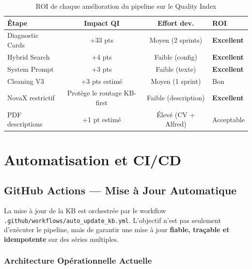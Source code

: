 \documentclass[12pt,a4paper]{report}
\begin{document}
\begin{table}[H]
\centering
\begin{tabular}{lccl}
\toprule
\textbf{Étape} & \textbf{Impact QI} & \textbf{Effort dev.} & \textbf{ROI} \\
\midrule
Diagnostic Cards & +33 pts & Moyen (2 sprints) & \textcolor{green!60!black}{\textbf{Excellent}} \\
Hybrid Search & +4 pts & Faible (config) & \textcolor{green!60!black}{\textbf{Excellent}} \\
System Prompt & +3 pts & Faible (texte) & \textcolor{green!60!black}{\textbf{Excellent}} \\
Cleaning V3 & +3 pts estimé & Moyen (1 sprint) & Bon \\
NovaX restrictif & Protège le routage KB-first & Faible (description) & \textcolor{green!60!black}{\textbf{Excellent}} \\
PDF descriptions & +1 pt estimé & Élevé (CV + Alfred) & Acceptable \\
\bottomrule
\end{tabular}
\caption{ROI de chaque amélioration du pipeline sur le Quality Index}
\label{tab:roi_pipeline_dead}
\end{table}

\fi

\chapter{Automatisation et CI/CD}

\section{GitHub Actions --- Mise à Jour Automatique}

La mise à jour de la KB est orchestrée par le workflow \texttt{.github/workflows/auto\_update\_kb.yml}. L'objectif n'est pas seulement d'exécuter le pipeline, mais de garantir une mise à jour \textbf{fiable, traçable et idempotente} sur des séries multiples.

\subsection{Architecture Opérationnelle Actuelle}
\end{document}
